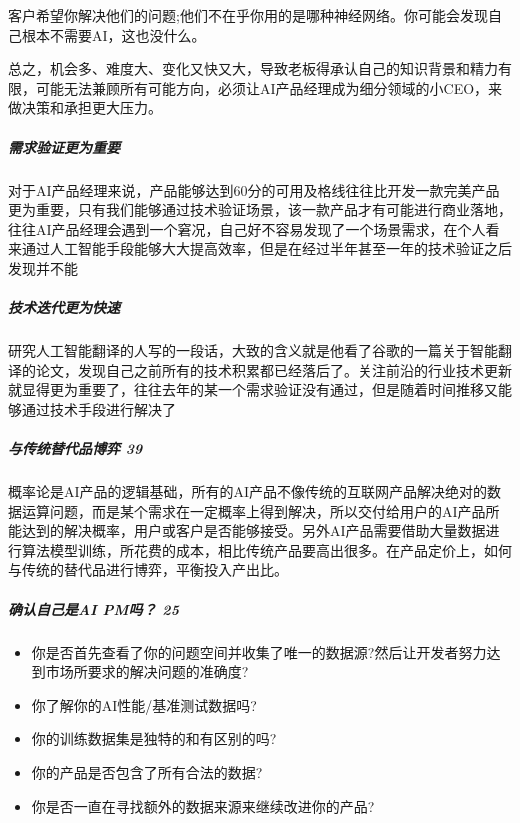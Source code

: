 \documentclass[letterpaper,11pt,english]{sphinxmanual}
\begin{document}
客户希望你解决他们的问题;他们不在乎你用的是哪种神经网络。你可能会发现自己根本不需要AI，这也没什么。

总之，机会多、难度大、变化又快又大，导致老板得承认自己的知识背景和精力有限，可能无法兼顾所有可能方向，必须让AI产品经理成为细分领域的小CEO，来做决策和承担更大压力。


\subparagraph{需求验证更为重要}
\label{\detokenize{chapter_introduction/AI_PM:id8}}
对于AI产品经理来说，产品能够达到60分的可用及格线往往比开发一款完美产品更为重要，只有我们能够通过技术验证场景，该一款产品才有可能进行商业落地，往往AI产品经理会遇到一个窘况，自己好不容易发现了一个场景需求，在个人看来通过人工智能手段能够大大提高效率，但是在经过半年甚至一年的技术验证之后发现并不能


\subparagraph{技术迭代更为快速}
\label{\detokenize{chapter_introduction/AI_PM:id9}}
研究人工智能翻译的人写的一段话，大致的含义就是他看了谷歌的一篇关于智能翻译的论文，发现自己之前所有的技术积累都已经落后了。关注前沿的行业技术更新就显得更为重要了，往往去年的某一个需求验证没有通过，但是随着时间推移又能够通过技术手段进行解决了


\subparagraph{与传统替代品博弈 39\sphinxfootnotemark[225]}
\label{\detokenize{chapter_introduction/AI_PM:id10}}%
\begin{footnotetext}[225]\sphinxAtStartFootnote
{}
%
\end{footnotetext}\ignorespaces 
概率论是AI产品的逻辑基础，所有的AI产品不像传统的互联网产品解决绝对的数据运算问题，而是某个需求在一定概率上得到解决，所以交付给用户的AI产品所能达到的解决概率，用户或客户是否能够接受。另外AI产品需要借助大量数据进行算法模型训练，所花费的成本，相比传统产品要高出很多。在产品定价上，如何与传统的替代品进行博弈，平衡投入产出比。


\subparagraph{确认自己是AI PM吗？ 25\sphinxfootnotemark[226]}
\label{\detokenize{chapter_introduction/AI_PM:ai-pm-25}}%
\begin{footnotetext}[226]\sphinxAtStartFootnote
{}
%
\end{footnotetext}\ignorespaces \begin{itemize}
\item {} 
你是否首先查看了你的问题空间并收集了唯一的数据源?然后让开发者努力达到市场所要求的解决问题的准确度?

\item {} 
你了解你的AI性能/基准测试数据吗?

\item {} 
你的训练数据集是独特的和有区别的吗?

\item {} 
你的产品是否包含了所有合法的数据?

\item {} 
你是否一直在寻找额外的数据来源来继续改进你的产品?

\end{itemize}
\end{document}
